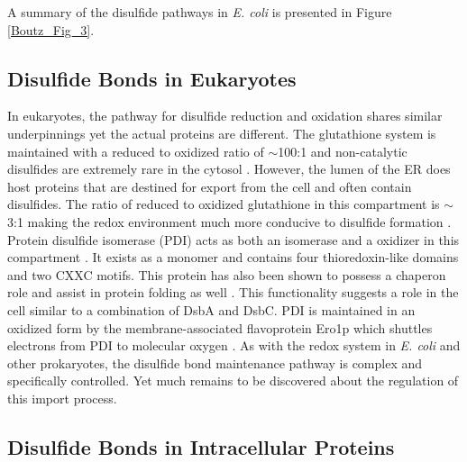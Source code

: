 A summary of the disulfide pathways in \emph{E. coli} is presented in Figure
\ref{Boutz_Fig_3}.

\subsection{Disulfide Bonds in Eukaryotes}

In eukaryotes, the pathway for disulfide reduction and oxidation shares similar
underpinnings yet the actual proteins are different.  The glutathione system is
maintained with a reduced to oxidized ratio of $\sim$100:1 and non-catalytic
disulfides are extremely rare in the cytosol \cite{95}.  However, the lumen of
the ER does host proteins that are destined for export from the cell and often
contain disulfides.  The ratio of reduced to oxidized glutathione in this
compartment is $\sim$3:1 making the redox environment much more conducive to
disulfide formation \cite{95}.  Protein disulfide isomerase (PDI) acts as both
an isomerase and a oxidizer in this compartment \cite{96,99}.  It exists as a
monomer and contains four thioredoxin-like domains and two CXXC motifs.  This
protein has also been shown to possess a chaperon role and assist in protein
folding as well \cite{97}.  This functionality suggests a role in the cell
similar to a combination of DsbA and DsbC.  PDI is maintained in an oxidized
form by the membrane-associated flavoprotein Ero1p \cite{102,103} which
shuttles electrons from PDI to molecular oxygen \cite{105,108}.  As with the
redox system in \emph{E. coli} and other prokaryotes, the disulfide bond
maintenance pathway is complex and specifically controlled.  Yet much remains
to be discovered about the regulation of this import process.

\subsection{Disulfide Bonds in Intracellular Proteins}

